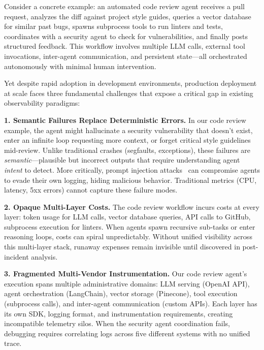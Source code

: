\documentclass[sigplan,screen,9pt]{acmart}
\begin{document}
Consider a concrete example: an automated code review agent receives a pull request, analyzes the diff against project style guides, queries a vector database for similar past bugs, spawns subprocess tools to run linters and tests, coordinates with a security agent to check for vulnerabilities, and finally posts structured feedback. This workflow involves multiple LLM calls, external tool invocations, inter-agent communication, and persistent state—all orchestrated autonomously with minimal human intervention.

Yet despite rapid adoption in development environments, production deployment at scale faces three fundamental challenges that expose a critical gap in existing observability paradigms:

\textbf{1. Semantic Failures Replace Deterministic Errors.} In our code review example, the agent might hallucinate a security vulnerability that doesn't exist, enter an infinite loop requesting more context, or forget critical style guidelines mid-review. Unlike traditional crashes (segfaults, exceptions), these failures are \emph{semantic}—plausible but incorrect outputs that require understanding agent \emph{intent} to detect. More critically, prompt injection attacks~\cite{indirect-prompt-inject} can compromise agents to evade their own logging, hiding malicious behavior. Traditional metrics (CPU, latency, 5xx errors) cannot capture these failure modes.

\textbf{2. Opaque Multi-Layer Costs.} The code review workflow incurs costs at every layer: token usage for LLM calls, vector database queries, API calls to GitHub, subprocess execution for linters. When agents spawn recursive sub-tasks or enter reasoning loops, costs can spiral unpredictably. Without unified visibility across this multi-layer stack, runaway expenses remain invisible until discovered in post-incident analysis.

\textbf{3. Fragmented Multi-Vendor Instrumentation.} Our code review agent's execution spans multiple administrative domains: LLM serving (OpenAI API), agent orchestration (LangChain), vector storage (Pinecone), tool execution (subprocess calls), and inter-agent communication (custom APIs). Each layer has its own SDK, logging format, and instrumentation requirements, creating incompatible telemetry silos. When the security agent coordination fails, debugging requires correlating logs across five different systems with no unified trace.
\end{document}
